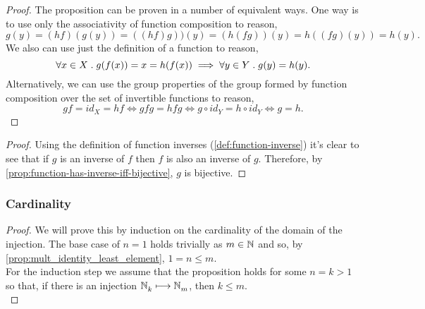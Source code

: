 \documentclass[../MathsNotesBase.tex]{subfiles}
\begin{document}
{\begin{proof}
			The proposition can be proven in a number of equivalent ways. One way is to use only the associativity of function composition to reason,
			\[ g(y) = (hf)(g(y)) = ((hf)g))(y) = (h(fg))(y) = h((fg)(y)) = h(y). \]
			We also can use just the definition of a function to reason,
			\[ \forall x \in X \;.\; g(f(x)) = x = h(f(x)) \implies \forall y \in Y \;.\; g(y) = h(y). \]
			Alternatively, we can use the group properties of the group formed by function composition over the set of invertible functions to reason,
			\[ gf = id_X = hf \iff gfg = hfg \iff g \circ id_Y = h \circ id_Y \iff g = h. \]
		\end{proof}
		
		\medskip
		\begin{proof}
			Using the definition of function inverses (\ref{def:function-inverse}) it's clear to see that if $g$ is an inverse of $f$ then $f$ is also an inverse of $g$. Therefore, by \autoref{prop:function-has-inverse-iff-bijective}, $g$ is bijective.
		\end{proof}
		
		
		
		\biggerskip
		\subsubsection{Cardinality}
		\bigskip
		
	
		\biggerskip
		\begin{proof}
			We will prove this by induction on the cardinality of the domain of the injection. The base case of ${ n = 1 }$ holds trivially as ${ m \in \mathbb{N}^{} }$ and so, by \autoref{prop:mult_identity_least_element}, ${ 1 = n \leq m }$.\\
			
			For the induction step we assume that the proposition holds for some ${ n = k > 1 }$ so that, if there is an injection ${ \mathbb{N}^{}_k \longmapsto \mathbb{N}^{}_m }$, then ${ k \leq m }$.\\
			

\end{proof}}
\end{document}
